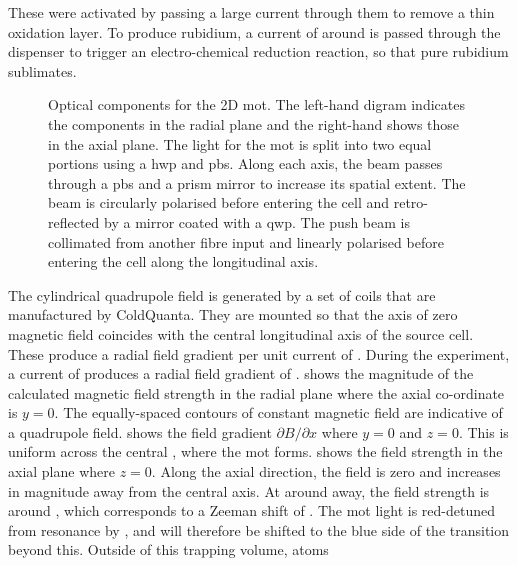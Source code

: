 These were activated by passing a large current through them to remove a thin
oxidation layer. To produce rubidium, a current of around  is passed through the dispenser
to trigger an electro-chemical reduction reaction, so that pure rubidium sublimates.
\begin{figure}[!htbp]
	\centering
	\def\svgwidth{0.7\textwidth}
	
  \caption[Optical components for the 2D \ac{mot}]{Optical components
  for the 2D \ac{mot}. The left-hand digram indicates the components
  in the radial plane and the right-hand shows those in the axial
  plane. The light for the \ac{mot} is split into two
equal portions using a \ac{hwp} and \ac{pbs}. Along each axis, the
beam passes through a \ac{pbs} and a prism mirror to increase its
spatial extent. The beam is circularly polarised before entering the
cell and retro-reflected by a mirror coated with a \ac{qwp}. The push
beam is collimated from another fibre input and linearly polarised
before entering the cell along the longitudinal axis.}
	\label{fig:2D_mot_optics}
\end{figure}
\par\noindent The cylindrical quadrupole field is generated by a set of coils
that are manufactured by ColdQuanta. They are mounted so that the axis of
zero magnetic field coincides with the central longitudinal axis of the source
cell. These produce a radial field gradient per unit current of
. During the
experiment, a current of  produces a radial field
gradient of .
 shows the magnitude of the calculated magnetic field
strength in the radial plane where the axial co-ordinate is $y = 0$.
The equally-spaced contours of constant magnetic field are indicative
of a quadrupole field.  shows the field
gradient $\partial B/\partial x$ where $y = 0$ and $z=0$. This is
uniform across the central , where the \ac{mot}
forms.  shows the field strength in the
axial plane where $z=0$. Along the axial direction, the field is zero
and increases in magnitude away from the central axis. At around
 away, the field strength is around
, which corresponds to a Zeeman shift of
. The \ac{mot} light is red-detuned from resonance
by , and will therefore be shifted to the blue side
of the transition beyond this. Outside of this trapping volume, atoms
